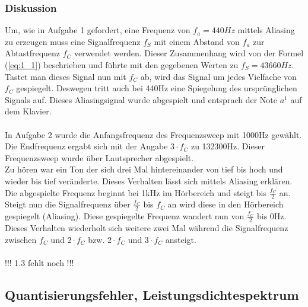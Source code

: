 \clearpage

\subsubsection{Diskussion}
Um, wie in Aufgabe 1 gefordert, eine Frequenz von $f_a = 440Hz$ mittels Aliasing zu erzeugen muss eine Signalfrequenz $f_S$ mit einem Abstand von $f_a$ zur Abtastfrequenz $f_C$ verwendet werden. Dieser Zusammenhang wird von der Formel (\ref{eq:1_1}) beschrieben und führte mit den gegebenen Werten zu $f_S = 43660Hz$. Tastet man dieses Signal nun mit $f_C$ ab, wird das Signal um jedes Vielfache von $f_C$ gespiegelt. Deswegen tritt auch bei 440Hz eine Spiegelung des ursprünglichen Signals auf. Dieses Aliasingsignal wurde abgespielt und entsprach der Note $a^1$ auf dem Klavier.\\
\\
In Aufgabe 2 wurde die Anfangsfrequenz des Frequenzsweep mit 1000Hz gewählt. Die Endfrequenz ergabt sich mit der Angabe $3 \cdot f_C$ zu 132300Hz. Dieser Frequenzsweep wurde über Lautsprecher abgespielt.\\
Zu hören war ein Ton der sich drei Mal hintereinander von tief bis hoch und wieder bis tief veränderte. Dieses Verhalten lässt sich mittels Aliasing erklären. Die abgespielte Frequenz beginnt bei 1kHz im Hörbereich und steigt bis $\frac{f_C}{2}$ an. Steigt nun die Signalfrequenz über $\frac{f_C}{2}$ bis $f_C$ an wird diese in den Hörbereich gespiegelt (Aliasing). Diese gespiegelte Frequenz wandert nun von $\frac{f_C}{2}$ bis 0Hz. Dieses Verhalten wiederholt sich weitere zwei Mal während die Signalfrequenz zwischen $f_C$ und $2 \cdot f_C$ bzw. $2 \cdot f_C$ und $3 \cdot f_C$ ansteigt.\\
\\
!!! 1.3 fehlt noch !!!
\pagebreak

%
%

\subsection{Quantisierungsfehler, Leistungsdichtespektrum}
